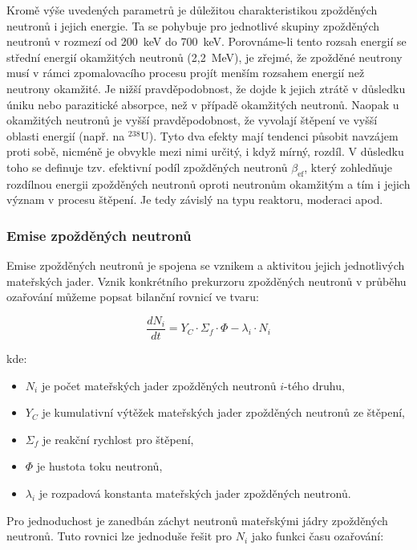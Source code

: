 Kromě výše uvedených parametrů je důležitou charakteristikou zpožděných neutronů i jejich energie. Ta se pohybuje pro jednotlivé skupiny zpožděných neutronů v rozmezí od 200~keV do 700~keV. Porovnáme-li tento rozsah energií se střední energií okamžitých neutronů (2,2~MeV), je zřejmé, že zpožděné neutrony musí v rámci zpomalovacího procesu projít menším rozsahem energií než neutrony okamžité. Je nižší pravděpodobnost, že dojde k jejich ztrátě v důsledku úniku nebo parazitické absorpce, než v případě okamžitých neutronů. Naopak u okamžitých neutronů je vyšší pravděpodobnost, že vyvolají štěpení ve vyšší oblasti energií (např. na $^{238}\text{U}$). Tyto dva efekty mají tendenci působit navzájem proti sobě, nicméně je obvykle mezi nimi určitý, i když mírný, rozdíl. V důsledku toho se definuje tzv. efektivní podíl zpožděných neutronů $\beta_\text{ef}$, který zohledňuje rozdílnou energii zpožděných neutronů oproti neutronům okamžitým a tím i jejich význam v procesu štěpení. Je tedy závislý na typu reaktoru, moderaci apod.

\subsubsection{Emise zpožděných neutronů}

Emise zpožděných neutronů je spojena se vznikem a aktivitou jejich jednotlivých mateřských jader. Vznik konkrétního prekurzoru zpožděných neutronů v průběhu ozařování můžeme popsat bilanční rovnicí ve tvaru:

\[
\frac{dN_i}{dt} = Y_C \cdot \Sigma_f \cdot \Phi - \lambda_i \cdot N_i
\]

kde:

\begin{itemize}%
    \item $N_i$ je počet mateřských jader zpožděných neutronů $i$-tého druhu,
    \item $Y_C$ je kumulativní výtěžek mateřských jader zpožděných neutronů ze štěpení,
    \item $\Sigma_f$ je reakční rychlost pro štěpení,
    \item $\Phi$ je hustota toku neutronů,
    \item $\lambda_i$ je rozpadová konstanta mateřských jader zpožděných neutronů.
\end{itemize}

Pro jednoduchost je zanedbán záchyt neutronů mateřskými jádry zpožděných neutronů. Tuto rovnici lze jednoduše řešit pro $N_i$ jako funkci času ozařování:

